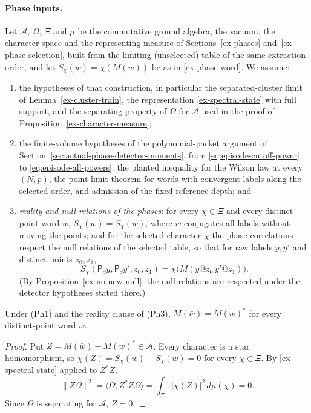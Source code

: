 \paragraph{Phase inputs.}
Let $\mathcal A$, $\Omega$, $\Xi$ and $\mu$ be the commutative ground
algebra, the vacuum, the character space and the representing measure of
Sections~\ref{ex-phases} and~\ref{ex-phase-selection}, built from the
limiting (unselected) table of the same extraction order, and let
$S_\chi(w)=\chi(M(w))$ be as in \eqref{ex-phase-word}. We assume:
\begin{enumerate}
\item[(Ph1)] the hypotheses of that construction, in particular the
 separated-cluster limit of Lemma~\ref{ex-cluster-train}, the
 representation \eqref{ex-spectral-state} with full support, and the
 separating property of $\Omega$ for $\mathcal A$ used in the proof of
 Proposition~\ref{ex-character-measure};
\item[(Ph2)] the finite-volume hypotheses of the polynomial-packet
 argument of Section~\ref{sec:actual-phase-detector-moments}, from
 \eqref{eq:episode-cutoff-power} to \eqref{eq:episode-all-powers}:
 the planted inequality for the Wilson law at every $(N,p)$, the
 point-limit theorem for words with convergent labels along the selected
 order, and admission of the fixed reference depth; and
\item[(Ph3)] \emph{reality and null relations of the phases}: for every
 $\chi\in\Xi$ and every distinct-point word $w$,
 $S_\chi(\bar w)=\overline{S_\chi(w)}$, where $\bar w$ conjugates all
 labels without moving the points; and for the selected character $\chi$
 the phase correlations respect the null relations of the selected
 table, so that for raw labels $y,y'$ and distinct points $z_0,z_1$,
 \[
  S_\chi(\mathsf P_dy,\mathsf P_dy';z_0,z_1)=\chi\bigl(M(y@z_0\,y'@z_1)\bigr).
 \]
 (By Proposition~\ref{ex-no-new-null}, the null relations are respected
 under the detector hypotheses stated there.)
\end{enumerate}

\begin{lemma}\label{lem:trace-rounded-conjugate}
Under (Ph1) and the reality clause of (Ph3), $M(\bar w)=M(w)^*$ for every
distinct-point word $w$.
\end{lemma}
\begin{proof}
Put $Z=M(\bar w)-M(w)^*\in\mathcal A$. Every character is a star
homomorphism, so $\chi(Z)=S_\chi(\bar w)-\overline{S_\chi(w)}=0$ for
every $\chi\in\Xi$. By \eqref{ex-spectral-state} applied to $Z^*Z$,
\[
 \|Z\Omega\|^2=\langle\Omega,Z^*Z\Omega\rangle
   =\int_\Xi|\chi(Z)|^2\,d\mu(\chi)=0 .
\]
Since $\Omega$ is separating for $\mathcal A$, $Z=0$.
\end{proof}

